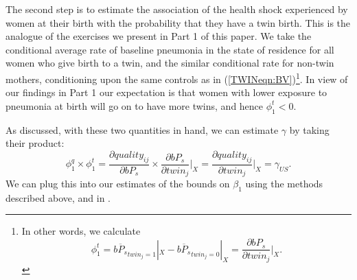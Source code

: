 \documentclass[subeqn]{article}
\begin{document}
\begin{spacing}{1.4}


The second step is to estimate the association of the health shock experienced by women at their birth with the probability that they have a twin birth. This is the analogue of the exercises we present in Part 1 of this paper. We take the conditional average rate of baseline pneumonia in the state of residence for all women who give birth to a twin, and
the similar conditional rate for non-twin mothers, conditioning upon the same
controls as in (\ref{TWINeqn:BV})\footnote{In other words, we calculate
  \[ \phi_1^t=\overline{bP_s}_{twin_j=1}|_{X}-\overline{bP_s}_{twin_j=0}|_{X}=
  \frac{\partial bP_s}{\partial twin_j}\bigg|_{X}.
  \]
}.  In view of our findings in Part 1 our expectation is that women with lower exposure to pneumonia at birth will go on to have more twins, and hence $\phi_1^t<0$.

As discussed, with these two quantities in hand, we can estimate $\gamma$ by taking their product:
\begin{equation}
  \label{TWINeqn:realgamma}
  \phi_1^q\times\phi_1^t=\frac{\partial quality_{ij}}{\partial bP_s}\times
  \frac{\partial bP_s}{\partial twin_j}\bigg|_{X}=
  \frac{\partial quality_{ij}}{\partial twin_j}\bigg|_{X}=\gamma_{US}.
\end{equation}
We can plug this into our estimates of the bounds on $\beta_1$ using the methods described above, and in \citet{Conleyetal2012}.


\end{spacing}
\end{document}

